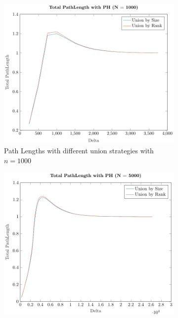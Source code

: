 \begin{figure}[ht]
    \centering
    \begin{subfigure}{0.32\textwidth}
        \centering
        \includegraphics[width=\textwidth]{../images/plotPHNonFull1000_PathLength.pdf}
        \caption{Path Lengths with different union strategies with $n = 1000$}
    \end{subfigure}%
    \hfill
    \begin{subfigure}{0.32\textwidth}
        \centering
        \includegraphics[width=\textwidth]{../images/plotPHNonFull5000_PathLength.pdf}

\end{subfigure}
\end{figure}
